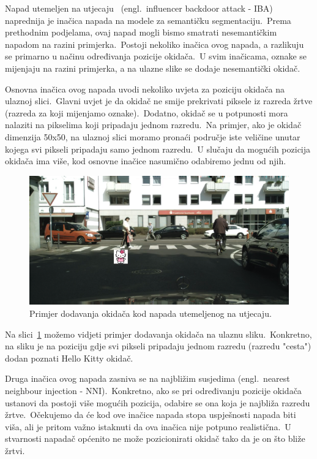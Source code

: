 \documentclass[times, utf8, seminar, numeric]{fer}
\begin{document}
Napad utemeljen na utjecaju~\cite{lan2023influencer} (engl.\ influencer backdoor attack - IBA) naprednija je inačica napada na modele za semantičku segmentaciju.\ 
Prema prethodnim podjelama, ovaj napad mogli bismo smatrati nesemantičkim napadom na razini primjerka.\ 
Postoji nekoliko inačica ovog napada, a razlikuju se primarno u načinu određivanja pozicije okidača.\ 
U svim inačicama, oznake se mijenjaju na razini primjerka, a na ulazne slike se dodaje nesemantički okidač.\ 
  
Osnovna inačica ovog napada uvodi nekoliko uvjeta za poziciju okidača na ulaznoj slici.\ 
Glavni uvjet je da okidač ne smije prekrivati piksele iz razreda žrtve (razreda za koji mijenjamo oznake).\ 
Dodatno, okidač se u potpunosti mora nalaziti na pikselima koji pripadaju jednom razredu.\ 
Na primjer, ako je okidač dimenzija 50x50, na ulaznoj slici moramo pronaći područje iste veličine unutar kojega svi pikseli pripadaju samo jednom razredu.\ 
U slučaju da mogućih pozicija okidača ima više, kod osnovne inačice nasumično odabiremo jednu od njih.\ 

\begin{figure}[htb]
    \centering
    \includegraphics[scale=0.75]{./Slike/iba.png}
    \caption{Primjer dodavanja okidača kod napada utemeljenog na utjecaju.}
    \label{fig:iba}
\end{figure}

Na slici~\ref{fig:iba} možemo vidjeti primjer dodavanja okidača na ulaznu sliku.\ 
Konkretno, na sliku je na poziciju gdje svi pikseli pripadaju jednom razredu (razredu "cesta") dodan poznati Hello Kitty okidač.\ 
  
Druga inačica ovog napada zasniva se na najbližim susjedima (engl.\ nearest neighbour injection - NNI).\ 
Konkretno, ako se pri određivanju pozicije okidača ustanovi da postoji više mogućih pozicija, odabire se ona koja je najbliža razredu žrtve.\ 
Očekujemo da će kod ove inačice napada stopa uspješnosti napada biti viša, ali je pritom važno istaknuti da ova inačica nije potpuno realistična.\ 
U stvarnosti napadač općenito ne može pozicionirati okidač tako da je on što bliže žrtvi.\ 
  
\end{document}
